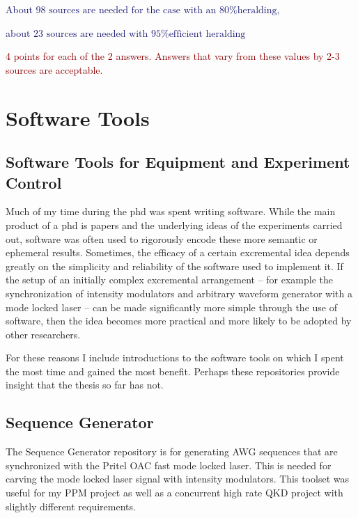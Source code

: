 \documentclass[11pt]{caltech_thesis} %
\begin{document}
\begin{enumerate}
  \textcolor{midnightblue}{About $\boxed{\text{98 sources are needed for the case with an 80\% heralding}}$, }

  \textcolor{midnightblue}{about $\boxed{\text{23 sources are needed with 95\% efficient heralding}}$}

  \textcolor{darkred}{ 4 points for each of the 2 answers. Answers that vary from these values by 2-3 sources are acceptable. }
\end{enumerate}

\hypertarget{software-tools}{%
\chapter{Software Tools}\label{software-tools}}

\hypertarget{software-tools-for-equipment-and-experiment-control}{%
\section{Software Tools for Equipment and Experiment Control}\label{software-tools-for-equipment-and-experiment-control}}

Much of my time during the phd was spent writing software. While the main product of a phd is papers and the underlying ideas of the experiments carried out, software was often used to rigorously encode these more semantic or ephemeral results. Sometimes, the efficacy of a certain excremental idea depends greatly on the simplicity and reliability of the software used to implement it. If the setup of an initially complex excremental arrangement -- for example the synchronization of intensity modulators and arbitrary waveform generator with a mode locked laser -- can be made significantly more simple through the use of software, then the idea becomes more practical and more likely to be adopted by other researchers.

For these reasons I include introductions to the software tools on which I spent the most time and gained the most benefit. Perhaps these repositories provide insight that the thesis so far has not.

\hypertarget{sequence-generator}{%
\section{Sequence Generator}\label{sequence-generator}}

The Sequence Generator repository is for generating AWG sequences that are synchronized with the Pritel OAC fast mode locked laser. This is needed for carving the mode locked laser signal with intensity modulators. This toolset was useful for my PPM project as well as a concurrent high rate QKD project with slightly different requirements.
\end{document}
